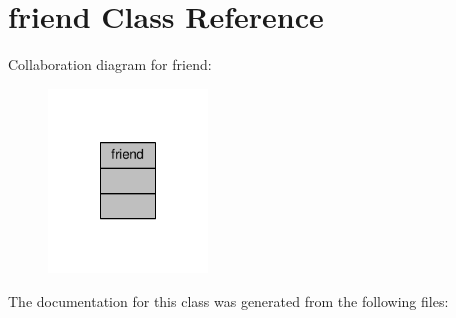 \hypertarget{classfriend}{\section{friend Class Reference}
\label{classfriend}
}


Collaboration diagram for friend\-:
\nopagebreak
\begin{figure}[H]
\begin{center}
\leavevmode
\includegraphics[width=120pt]{classfriend__coll__graph}
\end{center}
\end{figure}


The documentation for this class was generated from the following files\-:
